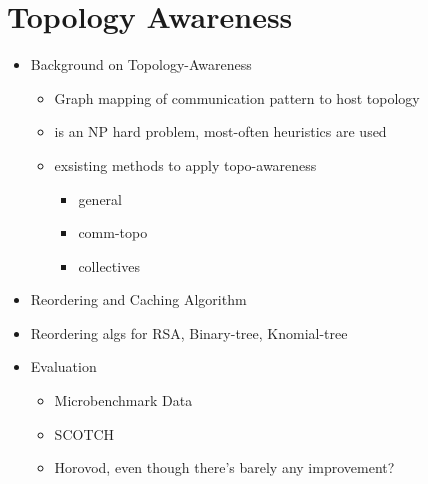 
\glsresetall %
\chapter[Topology]{Topology Awareness}\label{ch:TopologyAwareness}


\begin{itemize}
    \item Background on Topology-Awareness
    \begin{itemize}
        \item Graph mapping of communication pattern to host topology
        \item is an NP hard problem, most-often heuristics are used
        \item exsisting methods to apply topo-awareness
        \begin{itemize}
            \item general \cite{Hoefler2011GenericTopoMappingStrats, Mirsadeghi2016TopoAwareCollRR, Mirsadeghi2016MAGC}
            \item comm-topo \cite{Gropp2019CartTopoMapping}
            \item collectives \cite{Mercer2011ImprvMPIWithRR, Mirsadeghi2016TopoAwareCollRR}
        \end{itemize}
    \end{itemize}
    \item Reordering and Caching Algorithm
    \item Reordering algs for RSA, Binary-tree, Knomial-tree
    \item Evaluation
    \begin{itemize}
        \item Microbenchmark Data
        \item SCOTCH \cite{Pellegrini2012SCOTCH}
        \item Horovod, even though there's barely any improvement?
    \end{itemize}
\end{itemize}

